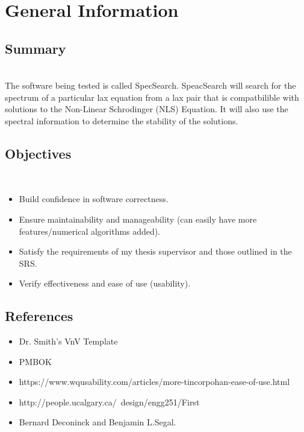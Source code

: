 \documentclass[12pt, titlepage]{article}
\begin{document}
\section{General Information}

\subsection{Summary}

 \\
The software being tested is called SpecSearch. SpeacSearch will search for the 
spectrum of a particular lax equation from a lax pair that is compatbilible 
with solutions to the Non-Linear Schrodinger (NLS) Equation. It will also use 
the spectral information to determine the stability of the solutions. 
\subsection{Objectives}

 \\
\begin{itemize}
	\item Build confidence in software correctness.
	\item Ensure maintainability and manageability (can easily 
	have more features/numerical algorithms added).
	\item Satisfy the requirements of my thesis supervisor and those outlined 
	in the SRS. 
	\item Verify effectiveness and ease of use (usability).	
\end{itemize}

\subsection{References}

\begin{itemize} 
	\item Dr. Smith's VnV Template 
	\item PMBOK 
	\item 
	https://www.wqusability.com/articles/more-tincorpohan-ease-of-use.html 
	\item 
	http://people.ucalgary.ca/~design/engg251/First%
	\item Bernard Deconinck and Benjamin L.Segal.
	
\end{itemize}
\end{document}
